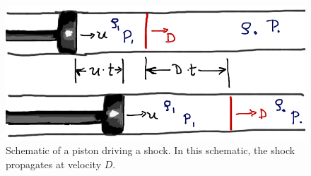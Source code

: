 \begin{figure}[htbp]
\includegraphics[width=\textwidth]{Figures/piston.png}
\caption{Schematic of a piston driving a shock.  In this schematic, the shock propagates at velocity $D$.}
\label{f.piston}
\end{figure}


